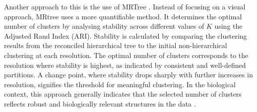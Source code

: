 Another approach to this is the use of MRTree \cite{pengCellTypeHierarchy2021}. Instead of focusing on a visual approach, MRtree uses a more quantifiable method. It determines the optimal number of clusters by analysing stability across different values of $K$ using the Adjusted Rand Index (ARI). Stability is calculated by comparing the clustering results from the reconciled hierarchical tree to the initial non-hierarchical clustering at each resolution. The optimal number of clusters corresponds to the resolution where stability is highest, as indicated by consistent and well-defined partitions.  A change point, where stability drops sharply with further increases in resolution, signifies the threshold for meaningful clustering. In the biological context, this approach generally indicates that the selected number of clusters reflects robust and biologically relevant structures in the data \cite{handlComputationalClusterValidation2005, ronanAvoidingCommonPitfalls2016}. %